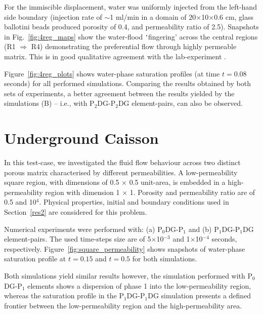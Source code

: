 \documentclass[preprint,authoryear,12pt]{elsarticle}
\newcommand{\PN}[2][error]{P$_{#1}$DG-P$_{#2}$}
\begin{document}
For the immiscible displacement, water was uniformly injected from the left-hand side boundary (injection rate of $\sim$1 ml/min in a domain of 20$\times$10$\times$0.6 cm, glass ballotini beads produced porosity of 0.4, and permeability ratio of 2.5). Snapshots in Fig.~\ref{fig:4reg_maps} show the water-flood $\lq$fingering' across the central regions (R1 $\Rightarrow$ R4) demonstrating the preferential flow through highly permeable matrix. This is in good qualitative agreement with the lab-experiment \citep[see Figs. 5 and 6 in][]{dawe_2008}.  


Figure~\ref{fig:4reg_plots} shows water-phase saturation profiles (at time $t=0.08$ seconds) for all performed  simulations. Comparing the results obtained by both sets of experiments, a better agreement between the results yielded by the simulations (B) -- i.e., with \PN[2]{2}DG element-pairs, can also be observed.


\section{Underground Caisson}\label{res3}
\label{res3}
In this test-case, we investigated the fluid flow behaviour across two distinct porous matrix characterised by different permeabilities. A low-permeability square region, with dimensions of 0.5 $\times$ 0.5 unit-area, is embedded in a high-permeability region with dimension  1 $\times$ 1. Porosity and permeability ratio are of 0.5 and 10$^{4}$.  Physical properties, initial and boundary conditions used in Section~\ref{res2} are considered for this problem.  

Numerical experiments were performed with: (a) \PN[0]{1} and (b) \PN[1]{1}DG element-pairs. The used time-steps size are of 5$\times$10$^{-3}$ and 1$\times$10$^{-4}$ seconds, respectively. Figure~\ref{fig:square_permeability} shows snapshots of water-phase saturation profile at $t = 0.15$ and $t = 0.5$ for both simulations. 

Both simulations yield similar results however, the simulation performed with \PN[0]{1} elements shows a dispersion of phase 1 into the low-permeability region, whereas the saturation profile in the \PN[1]{1}DG simulation presents a defined frontier between the low-permeability region and the high-permeability area.
\end{document}
